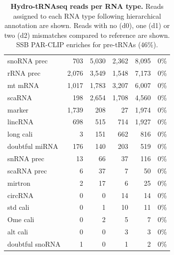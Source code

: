 \documentclass[12pt]{rockefeller}
\begin{document}
\begin{table}[!ht]
\begin{adjustbox}{max width = \textwidth}
\begin{tabular}{|l|r|r|r|r|r|}
     snoRNA prec &        703 &       5,030 &       2,362 &       8,095 &               0\% \\
       rRNA prec &      2,076 &       3,549 &       1,548 &       7,173 &               0\% \\
         mt mRNA &      1,017 &       1,783 &       3,207 &       6,007 &               0\% \\
          scaRNA &        198 &       2,654 &       1,708 &       4,560 &               0\% \\
          marker &      1,739 &         208 &          27 &       1,974 &               0\% \\
         lincRNA &        698 &         515 &         714 &       1,927 &               0\% \\
       long cali &          3 &         151 &         662 &         816 &               0\% \\
  doubtful miRNA &        176 &         140 &         203 &         519 &               0\% \\
      snRNA prec &         13 &          66 &          37 &         116 &               0\% \\
     scaRNA prec &          6 &          37 &           7 &          50 &               0\% \\
         mirtron &          2 &          17 &           6 &          25 &               0\% \\
         circRNA &          0 &           0 &          14 &          14 &               0\% \\
        std cali &          0 &           1 &          10 &          11 &               0\% \\
        Ome cali &          0 &           2 &           5 &           7 &               0\% \\
        alt cali &          0 &           0 &           3 &           3 &               0\% \\
 doubtful snoRNA &          1 &           0 &           1 &           2 &               0\% \\
\hline
  \end{tabular}
  \end{adjustbox}
\caption[Hydro-tRNAseq reads per RNA type]{\textbf{Hydro-tRNAseq reads per RNA type.} Reads assigned to each RNA type following hierarchical annotation are shown. Reads with no (d0), one (d1) or two (d2) mismatches compared to reference are shown. SSB PAR-CLIP enriches for pre-tRNAs (46\%).}\label{tableS3}
\end{table}
\end{document}
